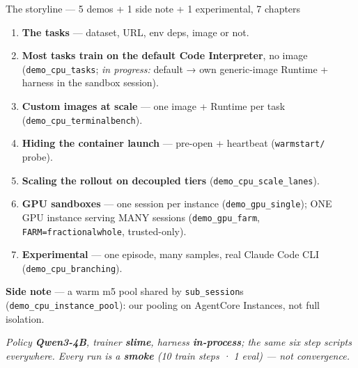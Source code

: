 \documentclass[
  10pt,
  ignorenonframetext,
  aspectratio=169,
  t]{beamer}
\providecommand{\tightlist}{%
  \setlength{\itemsep}{0pt}\setlength{\parskip}{0pt}}
\begin{document}
\begin{frame}{The storyline --- 5 demos + 1 side note + 1
experimental, 7 chapters}
\protect\hypertarget{the-storyline-5-demos-1-side-note-1-experimental-7-chapters}{}
\begin{enumerate}
\tightlist
\item
  \textbf{The tasks} --- dataset, URL, env deps, image or not.
\item
  \textbf{Most tasks train on the default Code Interpreter}, no image
  (\texttt{demo\_cpu\_tasks}; \emph{in progress:} default → own
  generic-image Runtime + harness in the sandbox session).
\item
  \textbf{Custom images at scale} --- one image + Runtime per task
  (\texttt{demo\_cpu\_terminalbench}).
\item
  \textbf{Hiding the container launch} --- pre-open + heartbeat
  (\texttt{warmstart/} probe).
\item
  \textbf{Scaling the rollout on decoupled tiers}
  (\texttt{demo\_cpu\_scale\_lanes}).
\item
  \textbf{GPU sandboxes} --- one session per instance
  (\texttt{demo\_gpu\_single}); ONE GPU instance serving MANY sessions
  (\texttt{demo\_gpu\_farm}, \texttt{FARM=fractional\textbar{}whole},
  trusted-only).
\item
  \textbf{Experimental} --- one episode, many samples, real Claude Code
  CLI (\texttt{demo\_cpu\_branching}).
\end{enumerate}

\textbf{Side note} --- a warm m5 pool shared by \texttt{sub\_session}s
(\texttt{demo\_cpu\_instance\_pool}): our pooling on AgentCore
Instances, not full isolation.

\emph{Policy \textbf{Qwen3-4B}, trainer \textbf{slime}, harness
\textbf{in-process}; the same six step scripts everywhere. Every run is
a \textbf{smoke} (10 train steps · 1 eval) --- not convergence.}
\end{frame}
\end{document}
